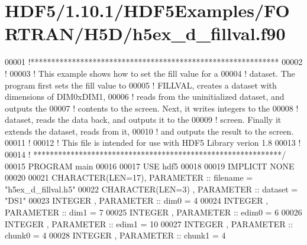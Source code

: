 \hypertarget{_h_d_f5_21_810_81_2_h_d_f5_examples_2_f_o_r_t_r_a_n_2_h5_d_2h5ex__d__fillval_8f90_source}{}\section{H\+D\+F5/1.10.1/\+H\+D\+F5\+Examples/\+F\+O\+R\+T\+R\+A\+N/\+H5\+D/h5ex\+\_\+d\+\_\+fillval.f90}
\label{_h_d_f5_21_810_81_2_h_d_f5_examples_2_f_o_r_t_r_a_n_2_h5_d_2h5ex__d__fillval_8f90_source}

\begin{DoxyCode}
00001 \textcolor{comment}{!************************************************************}
00002 \textcolor{comment}{!}
00003 \textcolor{comment}{!  This example shows how to set the fill value for a}
00004 \textcolor{comment}{!  dataset.  The program first sets the fill value to}
00005 \textcolor{comment}{!  FILLVAL, creates a dataset with dimensions of DIM0xDIM1,}
00006 \textcolor{comment}{!  reads from the uninitialized dataset, and outputs the}
00007 \textcolor{comment}{!  contents to the screen.  Next, it writes integers to the}
00008 \textcolor{comment}{!  dataset, reads the data back, and outputs it to the}
00009 \textcolor{comment}{!  screen.  Finally it extends the dataset, reads from it,}
00010 \textcolor{comment}{!  and outputs the result to the screen.}
00011 \textcolor{comment}{!}
00012 \textcolor{comment}{!  This file is intended for use with HDF5 Library verion 1.8}
00013 \textcolor{comment}{!}
00014 \textcolor{comment}{! ************************************************************/}
00015 \textcolor{keyword}{PROGRAM} main
00016 
00017   \textcolor{keywordtype}{USE }hdf5
00018 
00019   \textcolor{keywordtype}{IMPLICIT NONE}
00020 
00021   \textcolor{keywordtype}{CHARACTER(LEN=17)}, \textcolor{keywordtype}{PARAMETER} :: filename = \textcolor{stringliteral}{"h5ex\_d\_fillval.h5"}
00022   \textcolor{keywordtype}{CHARACTER(LEN=3)} , \textcolor{keywordtype}{PARAMETER} :: dataset  = \textcolor{stringliteral}{"DS1"}
00023   \textcolor{keywordtype}{INTEGER}          , \textcolor{keywordtype}{PARAMETER} :: dim0     = 4
00024   \textcolor{keywordtype}{INTEGER}          , \textcolor{keywordtype}{PARAMETER} :: dim1     = 7
00025   \textcolor{keywordtype}{INTEGER}          , \textcolor{keywordtype}{PARAMETER} :: edim0    = 6
00026   \textcolor{keywordtype}{INTEGER}          , \textcolor{keywordtype}{PARAMETER} :: edim1    = 10
00027   \textcolor{keywordtype}{INTEGER}          , \textcolor{keywordtype}{PARAMETER} :: chunk0   = 4
00028   \textcolor{keywordtype}{INTEGER}          , \textcolor{keywordtype}{PARAMETER} :: chunk1   = 4

\end{DoxyCode}
